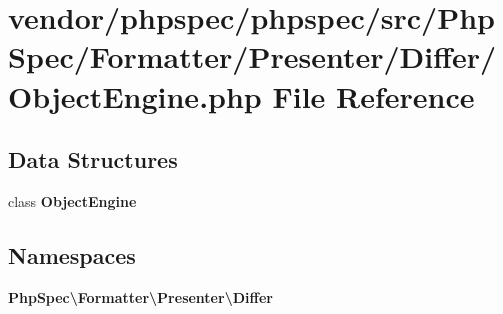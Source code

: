 \section{vendor/phpspec/phpspec/src/\+Php\+Spec/\+Formatter/\+Presenter/\+Differ/\+Object\+Engine.php File Reference}
\label{_object_engine_8php}
\subsection*{Data Structures}
\begin{DoxyCompactItemize}
\item 
class {\bf Object\+Engine}
\end{DoxyCompactItemize}
\subsection*{Namespaces}
\begin{DoxyCompactItemize}
\item 
 {\bf Php\+Spec\textbackslash{}\+Formatter\textbackslash{}\+Presenter\textbackslash{}\+Differ}
\end{DoxyCompactItemize}
